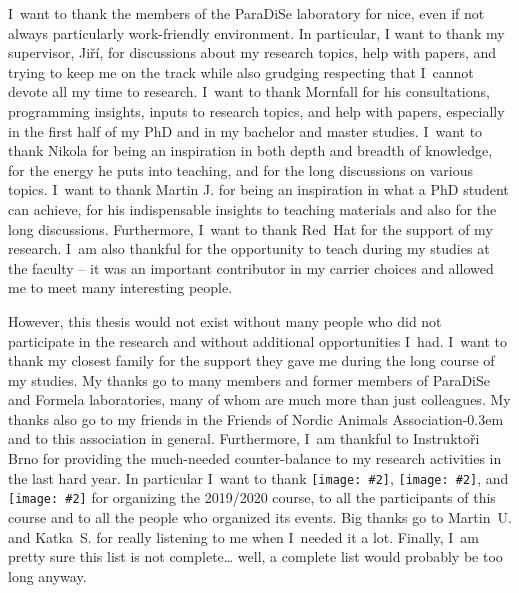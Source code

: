 I~want to thank the members of the ParaDiSe laboratory for nice, even if not always particularly work-friendly environment.
In particular, I want to thank my supervisor, Jiří, for discussions about my research topics, help with papers, and trying to keep me on the track while also grudging respecting that I~cannot devote all my time to research.
I~want to thank Mornfall for his consultations, programming insights, inputs to research topics, and help with papers, especially in the first half of my PhD and in my bachelor and master studies.
I~want to thank Nikola for being an inspiration in both depth and breadth of knowledge, for the energy he puts into teaching, and for the long discussions on various topics.
I~want to thank Martin J. for being an inspiration in what a PhD student can achieve, for his indispensable insights to teaching materials and also for the long discussions.
Furthermore, I~want to thank \mbox{Red Hat} for the support of my research.
I~am also thankful for the opportunity to teach during my studies at the faculty -- it was an important contributor in my carrier choices and allowed me to meet many interesting people.

\newcommand{\icon}[2][\heightof{X}]{\texttt{[image: \#2]}}

However, this thesis would not exist without many people who did not participate in the research and without additional opportunities I~had.
I~want to thank my closest family for the support they gave me during the long course of my studies.
My thanks go to many members and former members of ParaDiSe and Formela laboratories, many of whom are much more than just colleagues.
My thanks also go to my friends in the Friends of Nordic Animals Association\kern-0.3em\mnote[\icon{zverinec}]{Spolek přátel severské zvěře} and to this association in general.
Furthermore, I~am thankful to Instruktoři Brno for providing the much-needed counter-balance to my research activities in the last hard year. In particular I~want to thank \icon[\heightof{a}]{isb}, {\small\icon{isb}}, and \icon{isb} for organizing the 2019/2020 course, to all the participants of this course and to all the people who organized its events.
Big thanks go to Martin~U. and Katka~S. for really listening to me when I~needed it a lot.
Finally, I~am pretty sure this list is not complete… well, a complete list would probably be too long anyway.

\bigskip
\center{$\overrightwitchonbroom*{\xrightswishingghost{\qquad}\ \mathrightbat}$}

